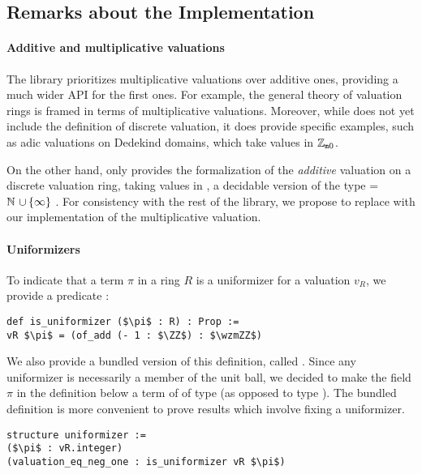\documentclass[sigplan,10pt,anonymous,review]{acmart}
\begin{document}
\subsection{Remarks about the Implementation}\label{subsec:implementation}

\paragraph{Additive and multiplicative valuations}
The \mathlib library prioritizes multiplicative valuations over additive ones, providing a much wider API for the first ones. For example, the general theory of valuation rings\href{https://leanprover-community.github.io/mathlib_docs/ring_theory/valuation/valuation_ring.html#valuation_ring.valuation}{\extlink} is framed in terms of multiplicative valuations. Moreover, while \mathlib does not yet include the definition of discrete valuation, it does provide specific examples, such as adic valuations on Dedekind domains, which take values in $\mathbb{Z}_{\mathtt{m}0}$.

On the other hand, \mathlib only provides the formalization of the \emph{additive} valuation \href{https://leanprover-community.github.io/mathlib_docs/ring_theory/discrete_valuation_ring/basic.html#discrete_valuation_ring.add_val}{\extlink} on a discrete valuation ring, taking values in , a decidable version of the type =\,$\mathbb{N}\mathtt{\ \cup \,\{\infty\}\ }$. 
For consistency with the rest of the library, we propose to replace  with our implementation of the multiplicative valuation.


\paragraph{Uniformizers}
To indicate that a term \code{(}$\pi$ in a ring $R$ is a uniformizer for a valuation $v_R$, we provide a predicate :\href{https://github.com/LCFT-Lean/local_fields/blob/76ad487d09babdb0018f394a5634526637ee014a/src/discrete_valuation_ring/basic.lean#L133}{\extlink}
\begin{lstlisting}
def is_uniformizer ($\pi$ : R) : Prop := 
vR $\pi$ = (of_add (- 1 : $\ZZ$) : $\wzmZZ$)
\end{lstlisting}

We also provide a bundled version of this definition, called \href{https://github.com/LCFT-Lean/local_fields/blob/76ad487d09babdb0018f394a5634526637ee014a/src/discrete_valuation_ring/basic.lean#L144}{\extlink}. Since any uniformizer is necessarily a member of the unit ball, we decided to make the field $\pi$ in the definition below a term of of type  (as opposed to type ). The bundled definition is more convenient to prove results which involve fixing a uniformizer.
\begin{lstlisting}
structure uniformizer :=
($\pi$ : vR.integer)
(valuation_eq_neg_one : is_uniformizer vR $\pi$)
\end{lstlisting}
\end{document}
